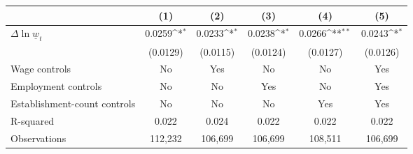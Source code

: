 {
\def\sym#1{\ifmmode^{#1}\else\(^{#1}\)\fi}
\begin{tabular}{l*{5}{c}}
\hline\hline
          &\multicolumn{1}{c}{(1)}         &\multicolumn{1}{c}{(2)}         &\multicolumn{1}{c}{(3)}         &\multicolumn{1}{c}{(4)}         &\multicolumn{1}{c}{(5)}         \\
\hline
$\Delta \ln \underline{w}_t$&   0.0259\sym{*}  &   0.0233\sym{*}  &   0.0238\sym{*}  &   0.0266\sym{**} &   0.0243\sym{*}  \\
          & (0.0129)         & (0.0115)         & (0.0124)         & (0.0127)         & (0.0126)         \\
\hline
Wage controls&       No         &      Yes         &       No         &       No         &      Yes         \\
Employment controls&       No         &       No         &      Yes         &       No         &      Yes         \\
Establishment-count controls&       No         &       No         &       No         &      Yes         &      Yes         \\
R-squared &    0.022         &    0.024         &    0.022         &    0.022         &    0.022         \\
Observations&  112,232         &  106,699         &  106,699         &  108,511         &  106,699         \\
\hline\hline
\end{tabular}
}
